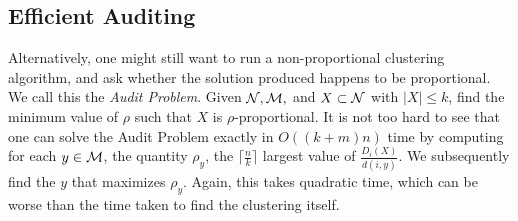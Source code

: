 \subsection{Efficient Auditing}
Alternatively, one might still want to run a non-proportional clustering algorithm, and ask whether the solution produced happens to be proportional. We call this the \textit{Audit Problem}. Given $\mathcal {N}, \mathcal{M},$ and $X \subset \mathcal {N}$ with $|X| \leq k$, find the minimum value of $\rho$ such that $X$ is $\rho$-proportional. %
It is not too hard to see that one can solve the Audit Problem exactly in $O((k+m)n)$ time by computing for each $y \in \mathcal{M}$, the quantity $\rho_y$, the $\lceil \frac{n}{k} \rceil$ largest value of $\frac{D_i(X)}{d(i, y)}$. We subsequently find the $y$ that maximizes $\rho_y$. Again, this takes quadratic time, which can be worse than the time taken to find the clustering itself.

